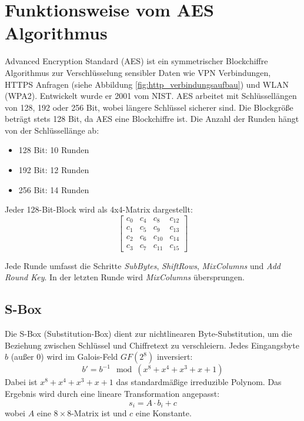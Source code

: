 \section{Funktionsweise vom AES Algorithmus}
\setlength{\parindent}{0pt}

Advanced Encryption Standard (AES) ist ein symmetrischer Blockchiffre Algorithmus zur 
Verschlüsselung sensibler Daten wie VPN Verbindungen, HTTPS Anfragen 
(siehe Abbildung \ref{fig:http_verbindungsaufbau}) und WLAN (WPA2). 
Entwickelt wurde er 2001 vom NIST. AES arbeitet mit Schlüssellängen von 128, 192 oder 256 Bit, 
wobei längere Schlüssel sicherer sind. Die Blockgröße beträgt stets 128 Bit, da AES eine Blockchiffre 
ist. Die Anzahl der Runden hängt von der Schlüssellänge ab: 
\begin{itemize}
    \item 128 Bit: 10 Runden
    \item 192 Bit: 12 Runden
    \item 256 Bit: 14 Runden
\end{itemize}

Jeder 128-Bit-Block wird als 4x4-Matrix dargestellt:
\[
\begin{bmatrix}
c_0  & c_4  & c_8  & c_{12} \\
c_1  & c_5  & c_9  & c_{13} \\
c_2  & c_6  & c_{10} & c_{14} \\
c_3  & c_7  & c_{11} & c_{15}
\end{bmatrix}
\]

Jede Runde umfasst die Schritte \textit{SubBytes}, \textit{ShiftRows}, \textit{MixColumns} und \textit{Add Round Key}. In der letzten Runde wird \textit{MixColumns} übersprungen.\cite{AES_Algorithmus_2}\cite{AES_Algorithmus_3}\cite{AES_Algorithmus}\cite{Blockchiffre}

\subsection{S-Box}
Die S-Box (Substitution-Box) dient zur nichtlinearen Byte-Substitution, um die Beziehung zwischen Schlüssel und Chiffretext zu verschleiern. Jedes Eingangsbyte \(b\) (außer 0) wird im Galois-Feld \(GF(2^8)\) inversiert:
\[
b' = b^{-1} \mod (x^8 + x^4 + x^3 + x + 1)
\]
Dabei ist \(x^8 + x^4 + x^3 + x + 1\) das standardmäßige irreduzible Polynom. Das Ergebnis wird durch eine lineare Transformation angepasst:
\[
s_i = A \cdot b_i + c
\]
wobei \(A\) eine $8 \times 8$-Matrix ist und \(c\) eine Konstante.\cite{Endliche_körper}\cite{S_Box}

